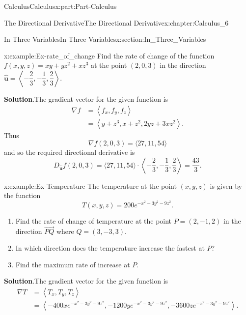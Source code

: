 \documentclass[oneside,10pt,]{book}
\newcommand{\blocktitlefont}{\relax}
\numberwithin{equation}{section}
\newcommand{\bm}[1]{\boldsymbol{#1}}
\newcommand{\amp}{&}
\begin{document}
\begin{partptx}{Calculus}{}{Calculus}{}{}{x:part:Part-Calculus}
\begin{chapterptx}{The Directional Derivative}{}{The Directional Derivative}{}{}{x:chapter:Calculus_6}
\begin{sectionptx}{In Three Variables}{}{In Three Variables}{}{}{x:section:In_Three_Variables}
\begin{example}{}{x:example:Ex-rate_of_change}%
Find the rate of change of the function \(f(x,y,z) = xy+yz^2+xz^3\) at the point \((2,0,3)\) in the direction \(\hat{\bm{u}} = \left \langle -\dfrac{2}{3}, -\dfrac{1}{3}, \dfrac{2}{3} \right \rangle\).%
\par\smallskip%
\noindent\textbf{\blocktitlefont Solution}.\hypertarget{g:solution:id551932}{}\quad{}The gradient vector for the given function is%
\begin{align*}
\nabla f \amp = \left \langle f_x, f_y, f_z \right \rangle\\
\amp = \left \langle y +z^3, x+z^2, 2yz+3xz^2 \right \rangle\text{.}
\end{align*}
Thus%
\begin{equation*}
\nabla f (2,0,3) = \langle 27, 11, 54 \rangle
\end{equation*}
and so the required directional derivative is%
\begin{equation*}
D_{\hat{\bm{u}}} f(2,0,3) = \langle 27, 11, 54 \rangle \cdot \left \langle -\dfrac{2}{3}, -\dfrac{1}{3}, \dfrac{2}{3} \right \rangle = \dfrac{43}{3}\text{.}
\end{equation*}
%
\end{example}
\begin{example}{}{x:example:Ex-Temperature}%
The temperature at the point \((x,y,z)\) is given by the function%
\begin{equation*}
T(x,y,z) = 200e^{-x^2-3y^2-9z^2}\text{.}
\end{equation*}
%
\begin{enumerate}[label=\alph*]
\item{}Find the rate of change of temperature at the point \(P = (2,-1,2)\) in the direction \(\overrightarrow{PQ}\) where \(Q = (3,-3,3)\).%
\item{}In which direction does the temperature increase the fastest at \(P\)?%
\item{}Find the maximum rate of increase at \(P\).%
\end{enumerate}
%
%
\par\smallskip%
\noindent\textbf{\blocktitlefont Solution}.\hypertarget{g:solution:id552020}{}\quad{}The gradient vector for the given function is%
\begin{align*}
\nabla T \amp = \left \langle T_x, T_y, T_z \right \rangle\\
\amp = \left \langle -400xe^{-x^2-3y^2-9z^2}, -1200ye^{-x^2-3y^2-9z^2},-3600ze^{-x^2-3y^2-9z^2} \right \rangle\text{.}
\end{align*}

\end{example}
\end{sectionptx}
\end{chapterptx}
\end{partptx}
\end{document}
